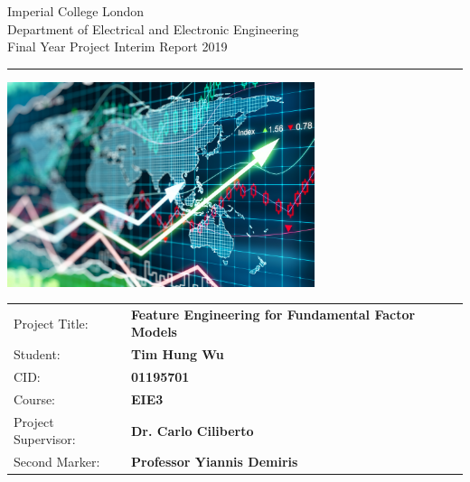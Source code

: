 \documentclass[10pt,onecolumn,letterpaper]{article}
\begin{document}
\begin{titlepage}
                \setlength{\parindent}{0pt}
                \setlength{\parskip}{0pt}

                {
                                \Large
                                \raggedright
                                Imperial College London\\[17pt]
                                Department of Electrical and Electronic Engineering\\[17pt]
                                Final Year Project Interim Report 2019\\[17pt]
                }

                \rule{\columnwidth}{3pt}
                \vfill
                \centering
                  \includegraphics[width=0.7\columnwidth,height=60mm,keepaspectratio]{logo.png}
                \vfill
                \setlength{\tabcolsep}{0pt}
                \begin{tabular}{p{40mm}p{\dimexpr\columnwidth-40mm}}
                      	Project Title: & \textbf{Feature Engineering for Fundamental Factor Models} \\[12pt]
                       	Student: & \textbf{Tim Hung Wu} \\[12pt]
                        	CID: & \textbf{01195701} \\[12pt]
                	    	Course: & \textbf{EIE3} \\[12pt]
                        	Project Supervisor: & \textbf{Dr. Carlo Ciliberto} \\[12pt]
          		Second Marker: & \textbf{Professor Yiannis Demiris} \\[12pt]
                \end{tabular}
\end{titlepage}
\end{document}
